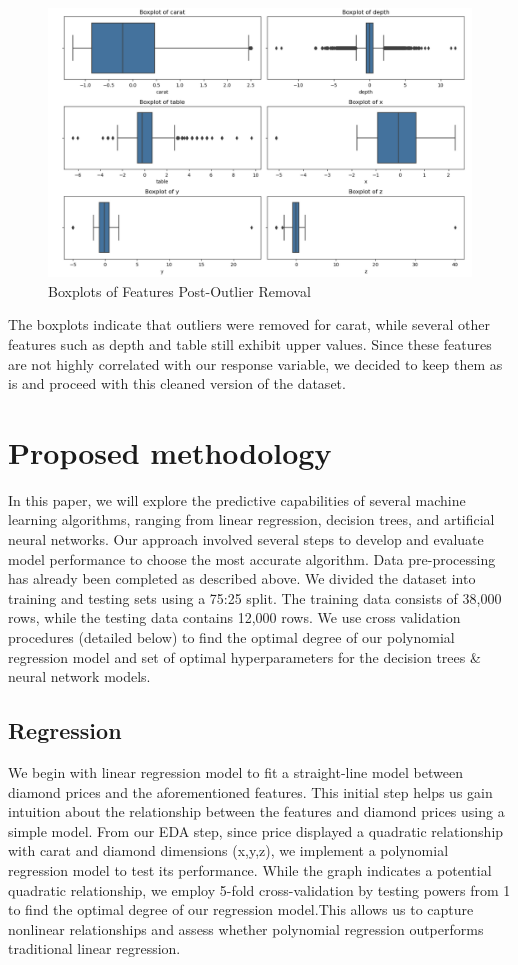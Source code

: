 \documentclass[conference]{IEEEtran}
\begin{document}
\begin{figure}[H]
    \centering
    \includegraphics[width=0.8\linewidth]{boxplot.png} %
    \caption{Boxplots of Features Post-Outlier Removal}
    \label{fig:boxplots}
\end{figure}

The boxplots indicate that outliers were removed for carat, while several other features such as depth and table still exhibit upper values. Since these features are not highly correlated with our response variable, we decided to keep them as is and proceed with this cleaned version of the dataset. 

\section{Proposed methodology}

In this paper, we will explore the predictive capabilities of several machine learning algorithms, ranging from linear regression, decision trees, and artificial neural networks. Our approach involved several steps to develop and evaluate model performance to choose the most accurate algorithm. Data pre-processing has already been completed as described above. We divided the dataset into training and testing sets using a 75:25 split. The training data consists of 38,000 rows, while the testing data contains 12,000 rows. We use cross validation procedures (detailed below) to find the optimal degree of our polynomial regression model and set of optimal hyperparameters for the decision trees \& neural network models. 

\subsection{Regression}

We begin with linear regression model to fit a straight-line model between diamond prices and the aforementioned features. This initial step helps us gain intuition about the relationship between the features and diamond prices using a simple model. From our EDA step, since price displayed a quadratic relationship with carat and diamond dimensions (x,y,z), we implement a polynomial regression model to test its performance. While the graph indicates a potential quadratic relationship, we employ 5-fold cross-validation by testing powers from 1 to find the optimal degree of our regression model.This allows us to capture nonlinear relationships and assess whether polynomial regression outperforms traditional linear regression.
\end{document}

